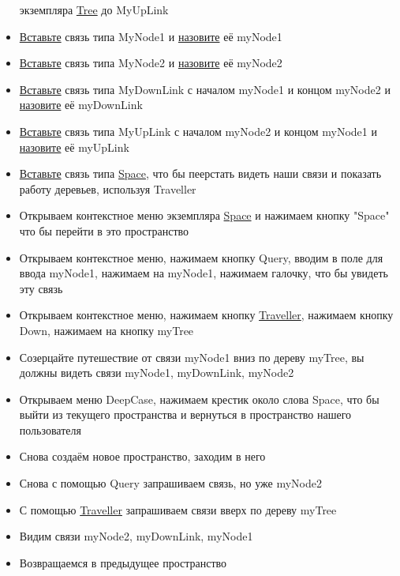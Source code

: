 \documentclass{article}
\begin{document}
\begin{itemize}
            экземпляра \hyperlink{Core.Tree.Description}{Tree} до MyUpLink
      \item \hyperlink{DeepCase.InsertLink.Description}{Вставьте} связь типа
            MyNode1
            и \hyperlink{FAQ.HowToSetName}{назовите} её myNode1
      \item \hyperlink{DeepCase.InsertLink.Description}{Вставьте} связь типа
            MyNode2
            и \hyperlink{FAQ.HowToSetName}{назовите} её myNode2
      \item \hyperlink{DeepCase.InsertLink.Description}{Вставьте} связь типа
            MyDownLink с началом myNode1 и концом myNode2 и
            \hyperlink{FAQ.HowToSetName}{назовите} её myDownLink
      \item \hyperlink{DeepCase.InsertLink.Description}{Вставьте} связь типа
            MyUpLink с началом myNode2 и концом myNode1 и
            \hyperlink{FAQ.HowToSetName}{назовите} её myUpLink
      \item \hyperlink{DeepCase.InsertLink.Description}{Вставьте} связь типа
            \hyperlink{Core.Space.Description}{Space}, что бы пеерстать видеть
            наши
            связи и показать
            работу деревьев, используя Traveller
      \item Открываем контекстное меню экземпляра
            \hyperlink{Core.Space.Description}{Space} и
            нажимаем кнопку "Space" что бы перейти в это пространство
      \item Открываем контекстное меню, нажимаем кнопку Query, вводим в поле
            для
            ввода myNode1, нажимаем на myNode1, нажимаем галочку, что бы
            увидеть
            эту связь
      \item Открываем контекстное меню, нажимаем кнопку
            \hyperlink{Traveller.Description}{Traveller}, нажимаем кнопку Down,
            нажимаем на
            кнопку
            myTree
      \item Созерцайте путешествие от связи myNode1 вниз по дереву myTree, вы
            должны видеть связи myNode1, myDownLink, myNode2
      \item Открываем меню DeepCase, нажимаем крестик около слова Space, что бы
            выйти из текущего пространства и вернуться в пространство нашего
            пользователя
      \item Снова создаём новое пространство, заходим в него
      \item Снова с помощью Query запрашиваем связь, но уже myNode2
      \item С помощью \hyperlink{Traveller.Description}{Traveller} запрашиваем
            связи вверх
            по дереву myTree
      \item Видим связи myNode2, myDownLink, myNode1
      \item Возвращаемся в предыдущее пространство
\end{itemize}
\end{document}
